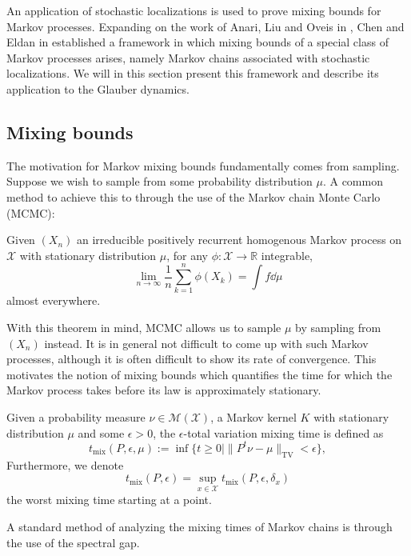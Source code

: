 An application of stochastic localizations is used to prove mixing bounds for Markov processes. 
Expanding on the work of Anari, Liu and Oveis in \cite{Anari_2020}, Chen and Eldan in \cite{Chen_2022} 
established a framework in which mixing bounds of a special class of Markov processes arises, namely Markov 
chains associated with stochastic localizations. We will in this section present this 
framework and describe its application to the Glauber dynamics.

\subsection{Mixing bounds}

The motivation for Markov mixing bounds fundamentally comes from sampling. Suppose we wish to sample 
from some probability distribution $\mu$. A common method to achieve this to through the use of the 
Markov chain Monte Carlo (MCMC):
\begin{theorem}\label{thm:markov_conv}
  Given \((X_n)\) an irreducible positively recurrent homogenous Markov process on \(\mathcal{X}\) with
  stationary distribution \(\mu\), for any \(\phi : \mathcal{X} \to \mathbb{R}\) integrable, 
  \[\lim_{n \to \infty} \frac{1}{n} \sum_{k = 1}^n \phi(X_k) = \int f \dd \mu\]
  almost everywhere.  
\end{theorem}
With this theorem in mind, MCMC allows us to sample \(\mu\) by sampling from \((X_n)\) instead. It is in general 
not difficult to come up with such Markov processes, although it is often difficult to show its rate of convergence. 
This motivates the notion of mixing bounds which quantifies the time for which the Markov process takes before 
its law is approximately stationary.

\begin{definition}
  Given a probability measure \(\nu \in \mathcal{M}(\mathcal{X})\), a Markov kernel \(K\) with stationary 
  distribution \(\mu\) and some \(\epsilon > 0\), the \(\epsilon\)-total variation mixing time is defined as 
  \[t_{\text{mix}}(P, \epsilon, \mu) := \inf \{t \ge 0 \mid \|P^t\nu - \mu\|_{\text{TV}} < \epsilon\},\]
  Furthermore, we denote 
  \[t_{\text{mix}}(P, \epsilon) = \sup_{x \in \mathcal{X}} t_{\text{mix}}(P, \epsilon, \delta_x)\]
  the worst mixing time starting at a point.
\end{definition}

A standard method of analyzing the mixing times of Markov chains is through the use of the spectral gap. 

